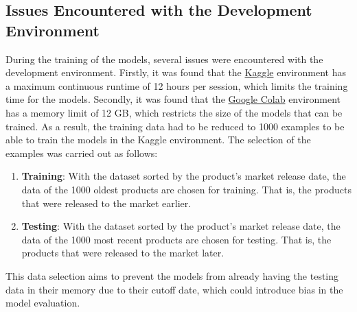 \subsection{Issues Encountered with the Development Environment}
During the training of the models, several issues were encountered with the development environment. Firstly, it was found that the \href{https://www.kaggle.com}{Kaggle} environment has a maximum continuous runtime of 12 hours per session, which limits the training time for the models. Secondly, it was found that the \href{https://colab.research.google.com}{Google Colab} environment has a memory limit of 12 GB, which restricts the size of the models that can be trained. As a result, the training data had to be reduced to 1000 examples to be able to train the models in the Kaggle environment. The selection of the examples was carried out as follows:

\begin{enumerate}
    \item \textbf{Training}: With the dataset sorted by the product's market release date, the data of the 1000 oldest products are chosen for training. That is, the products that were released to the market earlier.
    \item \textbf{Testing}: With the dataset sorted by the product's market release date, the data of the 1000 most recent products are chosen for testing. That is, the products that were released to the market later.
\end{enumerate}
This data selection aims to prevent the models from already having the testing data in their memory due to their cutoff date, which could introduce bias in the model evaluation.

